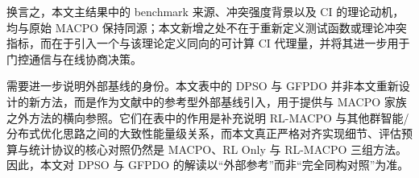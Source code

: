 \documentclass[conference]{IEEEtran}
\begin{document}
换言之，本文主结果中的 benchmark 来源、冲突强度背景以及 CI 的理论动机，均与原始 MACPO 保持同源；本文新增之处不在于重新定义测试函数或理论冲突指标，而在于引入一个与该理论定义同向的可计算 CI 代理量，并将其进一步用于门控通信与在线协商决策。

需要进一步说明外部基线的身份。本文表中的 DPSO 与 GFPDO 并非本文重新设计的新方法，而是作为文献中的参考型外部基线引入，用于提供与 MACPO 家族之外方法的横向参照。它们在表中的作用是补充说明 RL-MACPO 与其他群智能/分布式优化思路之间的大致性能量级关系，而本文真正严格对齐实现细节、评估预算与统计协议的核心对照仍然是 MACPO、RL Only 与 RL-MACPO 三组方法。因此，本文对 DPSO 与 GFPDO 的解读以“外部参考”而非“完全同构对照”为准。

\begin{table}[htbp]
\centering
\tiny
\setlength{\tabcolsep}{1.8pt}
\renewcommand{\arraystretch}{1.00}
\caption{Comparison with MACPO on LLSO and CSO benchmarks (25 runs). Mean, median, std, and p-value are reported. Columns keep the naming used in this paper: MACPO, RL Only, and RL-MACPO. DPSO and GFPDO are included as literature-based external reference baselines. For LLSO, p-values are from the Wilcoxon rank-sum test; for CSO, p-values are from the Mann-Whitney U test. * significantly better than MACPO; \# significantly worse than MACPO.}
\label{tab:macpo_style_all}
\end{table}
\end{document}
